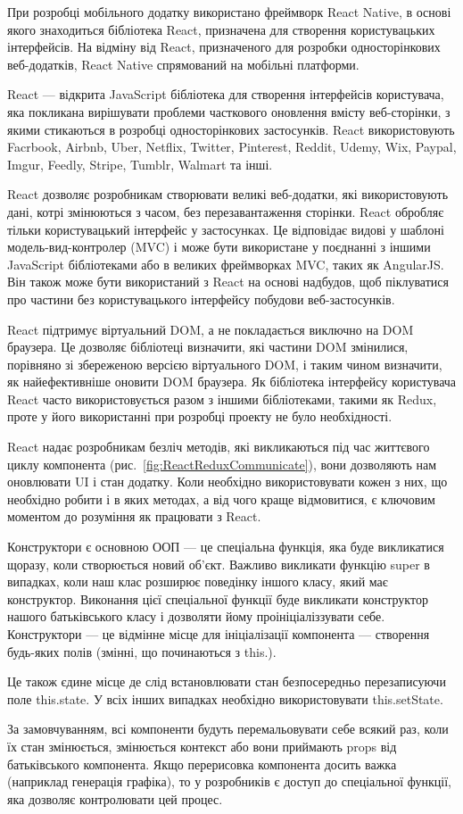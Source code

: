 При розробці мобільного додатку використано фреймворк React Native, в основі якого знаходиться бібліотека React, призначена для створення користувацьких інтерфейсів. На відміну від React, призначеного для розробки односторінкових веб-додатків, React Native спрямований на мобільні платформи.

React — відкрита JavaScript бібліотека для створення інтерфейсів користувача, яка покликана вирішувати проблеми часткового оновлення вмісту веб-сторінки, з якими стикаються в розробці односторінкових застосунків. React використовують Facrbook, Airbnb, Uber, Netflix, Twitter, Pinterest, Reddit, Udemy, Wix, Paypal, Imgur, Feedly, Stripe, Tumblr, Walmart та інші.

React дозволяє розробникам створювати великі веб-додатки, які використовують дані, котрі змінюються з часом, без перезавантаження сторінки. React обробляє тільки користувацький інтерфейс у застосунках. Це відповідає видові у шаблоні модель-вид-контролер (MVC) і може бути використане у поєднанні з іншими JavaScript бібліотеками або в великих фреймворках MVC, таких як AngularJS. Він також може бути використаний з React на основі надбудов, щоб піклуватися про частини без користувацького інтерфейсу побудови веб-застосунків.

React підтримує віртуальний DOM, а не покладається виключно на DOM браузера. Це дозволяє бібліотеці визначити, які частини DOM змінилися, порівняно зі збереженою версією віртуального DOM, і таким чином визначити, як найефективніше оновити DOM браузера. Як бібліотека інтерфейсу користувача React часто використовується разом з іншими бібліотеками, такими як Redux, проте у його використанні при розробці проекту не було необхідності.

React надає розробникам безліч методів, які викликаються під час життєвого циклу компонента (рис.~\ref{fig:ReactReduxCommunicate}), вони дозволяють нам оновлювати UI і стан додатку. Коли необхідно використовувати кожен з них, що необхідно робити і в яких методах, а від чого краще відмовитися, є ключовим моментом до розуміння як працювати з React.


Конструктори є основною ООП — це спеціальна функція, яка буде викликатися щоразу, коли створюється новий об'єкт. Важливо викликати функцію super в випадках, коли наш клас розширює поведінку іншого класу, який має конструктор. Виконання цієї спеціальної функції буде викликати конструктор нашого батьківського класу і дозволяти йому проініціаліззувати себе. 
Конструктори —  це відмінне місце для ініціалізації компонента —  створення будь-яких полів (змінні, що починаються з this.).

Це також єдине місце де слід встановлювати стан безпосередньо перезаписуючи поле this.state. У всіх інших випадках необхідно використовувати this.setState.

За замовчуванням, всі компоненти будуть перемальовувати себе всякий раз, коли їх стан змінюється, змінюється контекст або вони приймають props від батьківського компонента. Якщо перерисовка компонента досить важка (наприклад генерація графіка), то у розробників є доступ до спеціальної функції, яка дозволяє контролювати цей процес.
